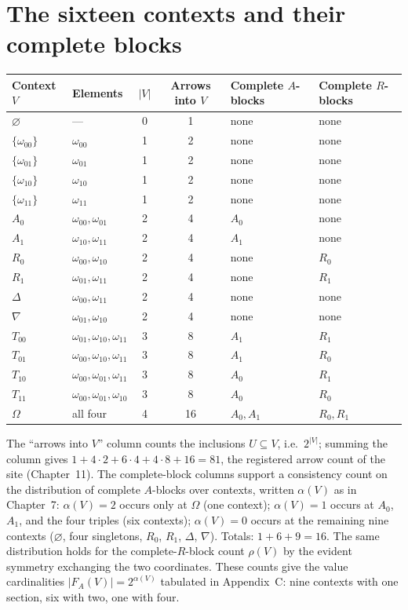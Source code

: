 \section{The sixteen contexts and their complete blocks}
\label{appA:sec:contexts}

\begin{longtable}{@{}llccll@{}}
\toprule
Context $V$ & Elements & $|V|$ & Arrows into $V$ & Complete $A$-blocks &
Complete $R$-blocks \\
\midrule
\endhead
\bottomrule
\endfoot
$\varnothing$ & --- & 0 & 1 & none & none \\
$\{\omega_{00}\}$ & $\omega_{00}$ & 1 & 2 & none & none \\
$\{\omega_{01}\}$ & $\omega_{01}$ & 1 & 2 & none & none \\
$\{\omega_{10}\}$ & $\omega_{10}$ & 1 & 2 & none & none \\
$\{\omega_{11}\}$ & $\omega_{11}$ & 1 & 2 & none & none \\
$A_0$ & $\omega_{00}, \omega_{01}$ & 2 & 4 & $A_0$ & none \\
$A_1$ & $\omega_{10}, \omega_{11}$ & 2 & 4 & $A_1$ & none \\
$R_0$ & $\omega_{00}, \omega_{10}$ & 2 & 4 & none & $R_0$ \\
$R_1$ & $\omega_{01}, \omega_{11}$ & 2 & 4 & none & $R_1$ \\
$\Delta$ & $\omega_{00}, \omega_{11}$ & 2 & 4 & none & none \\
$\nabla$ & $\omega_{01}, \omega_{10}$ & 2 & 4 & none & none \\
$T_{00}$ & $\omega_{01}, \omega_{10}, \omega_{11}$ & 3 & 8 & $A_1$ & $R_1$ \\
$T_{01}$ & $\omega_{00}, \omega_{10}, \omega_{11}$ & 3 & 8 & $A_1$ & $R_0$ \\
$T_{10}$ & $\omega_{00}, \omega_{01}, \omega_{11}$ & 3 & 8 & $A_0$ & $R_1$ \\
$T_{11}$ & $\omega_{00}, \omega_{01}, \omega_{10}$ & 3 & 8 & $A_0$ & $R_0$ \\
$\Omega$ & all four & 4 & 16 & $A_0, A_1$ & $R_0, R_1$ \\
\end{longtable}

The ``arrows into $V$'' column counts the inclusions $U \subseteq V$,
i.e.\ $2^{|V|}$; summing the column gives
$1 + 4 \cdot 2 + 6 \cdot 4 + 4 \cdot 8 + 16 = 81$, the registered arrow
count of the site (Chapter~11). The complete-block columns support a
consistency count on the distribution of complete $A$-blocks over
contexts, written $\alpha(V)$ as in Chapter~7: $\alpha(V) = 2$ occurs only
at $\Omega$ (one context); $\alpha(V) = 1$ occurs at $A_0$, $A_1$, and the
four triples (six contexts); $\alpha(V) = 0$ occurs at the remaining nine
contexts ($\varnothing$, four singletons, $R_0$, $R_1$, $\Delta$,
$\nabla$). Totals: $1 + 6 + 9 = 16$. The same distribution holds for the
complete-$R$-block count $\rho(V)$ by the evident symmetry exchanging the
two coordinates. These counts give the value cardinalities
$|F_A(V)| = 2^{\alpha(V)}$ tabulated in Appendix~C: nine contexts with one
section, six with two, one with four.

